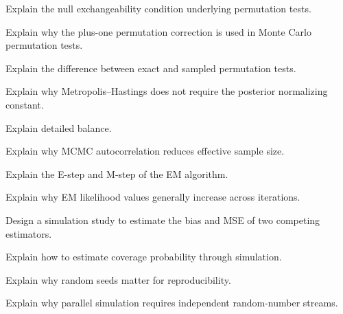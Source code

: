 \begin{exercise}[3]
Explain the null exchangeability condition underlying permutation tests.
\end{exercise}

\begin{exercise}[3]
Explain why the plus-one permutation correction is used in Monte Carlo
permutation tests.
\end{exercise}

\begin{exercise}[3]
Explain the difference between exact and sampled permutation tests.
\end{exercise}

\begin{exercise}[3]
Explain why Metropolis--Hastings does not require the posterior
normalizing constant.
\end{exercise}

\begin{exercise}[3]
Explain detailed balance.
\end{exercise}

\begin{exercise}[3]
Explain why MCMC autocorrelation reduces effective sample size.
\end{exercise}

\begin{exercise}[3]
Explain the E-step and M-step of the EM algorithm.
\end{exercise}

\begin{exercise}[3]
Explain why EM likelihood values generally increase across iterations.
\end{exercise}

\begin{exercise}[3]
Design a simulation study to estimate the bias and MSE of two competing
estimators.
\end{exercise}

\begin{exercise}[3]
Explain how to estimate coverage probability through simulation.
\end{exercise}

\begin{exercise}[3]
Explain why random seeds matter for reproducibility.
\end{exercise}

\begin{exercise}[3]
Explain why parallel simulation requires independent random-number
streams.
\end{exercise}

